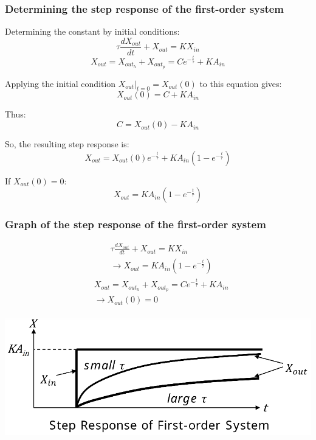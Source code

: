 \documentclass[11pt]{article}
\begin{document}
\subsubsection{Determining the step response of the first-order system}
\label{sec:orgbcc0269}
Determining the constant by initial conditions:
\[\tau \frac{dX_{out}}{dt} + X_{out} = KX_{in}\]
\[X_{out} = X_{out_h} + X_{out_p} = C e^{- \frac{t}{\tau}} + KA_{in}\]

Applying the initial condition \(\left.X_{out} \right|_{t = 0} = X_{out} (0)\) to this equation gives:
\[X_{out} (0) = C + KA_{in}\]

Thus:
\[C = X_{out} (0) - KA_{in}\]

So, the resulting step response is:
\[X_{out} = X_{out} (0) e^{- \frac{t}{\tau}} + KA_{in} (1 - e^{- \frac{t}{\tau}})\]

If \(X_{out} (0) = 0\):
\[X_{out} = KA_{in} (1 - e^{- \frac{t}{\tau}})\]
\subsubsection{Graph of the step response of the first-order system}
\label{sec:orgd7a32bf}
\begin{align*}
&\tau \frac{dX_{out}}{dt} + X_{out} = KX_{in} \\
&\rightarrow X_{out} = KA_{in} (1 - e^{- \frac{t}{\tau}})
\end{align*}
\begin{align*}
&X_{out} = X_{out_h} + X_{out_p} = C e^{- \frac{t}{\tau}} + KA_{in} \\
&\rightarrow X_{out} (0) = 0
\end{align*}

\begin{center}
\includegraphics[width=.9\linewidth]{./images/step-response-of-first-order-system-graph.png}
\end{center}
\end{document}
